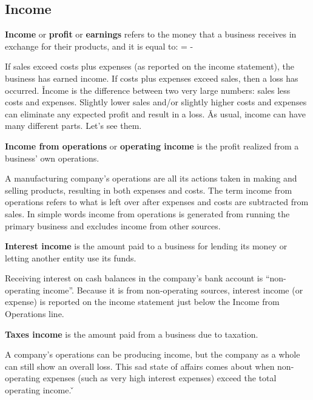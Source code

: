 \subsection{Income}

\textbf{Income} or \textbf{profit} or \textbf{earnings} refers to the money that a business receives in exchange for
their products, and it is equal to:
\bse
{} =  - 
\ese
\ed

If sales exceed costs plus expenses (as reported on the income statement), the business has earned income. If costs
plus expenses exceed sales, then a loss has occurred. \v

Income is the difference between two very large numbers: sales less costs and expenses. Slightly lower sales and/or
slightly higher costs and expenses can eliminate any expected profit and result in a loss. \v 

As usual, income can have many different parts. Let's see them.

\textbf{Income from operations} or \textbf{operating income} is the profit realized from a business' own operations.
\ed

A manufacturing company's operations are all its actions taken in making and selling products, resulting in both
expenses and costs. The term income from operations refers to what is left over after expenses and costs are
subtracted from sales. In simple words income from operations is generated from running the primary business and
excludes income from other sources.

\textbf{Interest income} is the amount paid to a business for lending its money or letting another entity use its funds.
\ed

Receiving interest on cash balances in the company's bank account is ``non-operating income''. Because it is from
non-operating sources, interest income (or expense) is reported on the income statement just below the Income from
Operations line.

\textbf{Taxes income} is the amount paid from a business due to taxation.
\ed

A company's operations can be producing income, but the company as a whole can still show an overall loss. This sad
state of affairs comes about when non-operating expenses (such as very high interest expenses) exceed the total
operating income. \v

